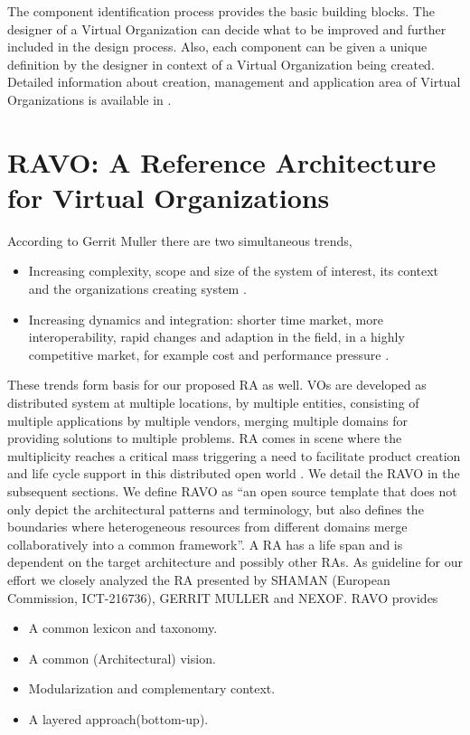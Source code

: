\documentclass[]{article}
\begin{document}
The component identification process provides the basic building blocks. The designer of a Virtual Organization can decide what to be improved and further included in the design process. Also, each component can be given a unique definition by the designer in context of a Virtual Organization being created.  Detailed information about creation, management and application area of Virtual Organizations is available in \cite{Kesselman2008}.

\section{RAVO: A Reference Architecture for Virtual Organizations}\label{sec:ravo}
According to Gerrit Muller \cite{Gerrit} there are two simultaneous trends,
\begin{itemize}
\item Increasing complexity, scope and size of the system of interest, its context and the organizations creating system \cite{Gerrit}.
\item Increasing dynamics and integration: shorter time market, more interoperability, rapid changes and adaption in the field, in a highly competitive market, for example cost and performance pressure  \cite{Gerrit}.
\end{itemize}
These trends form basis for our proposed RA as well. VOs are developed as distributed system at multiple locations, by multiple entities, consisting of multiple applications by multiple vendors, merging multiple domains for providing solutions to multiple problems. RA comes in scene where the multiplicity reaches a critical mass triggering a need to facilitate product creation and life cycle support in this distributed open world \cite{Gerrit}.
We detail the RAVO in the subsequent sections.
We define RAVO as ``an open source template that does not only depict the architectural patterns and terminology, but also defines the boundaries where heterogeneous resources from different domains merge collaboratively into a common framework''.
A RA has a life span and is dependent on the target architecture and possibly other RAs. As guideline for our effort we closely analyzed the RA presented by SHAMAN (European Commission, ICT-216736),  GERRIT MULLER \cite{Gerrit} and NEXOF\cite{nexof}. RAVO provides
\begin{itemize}
\item A common lexicon and taxonomy.
\item A common (Architectural) vision.
\item Modularization and complementary context.
\item A layered approach(bottom-up).
\end{itemize}
\end{document}
